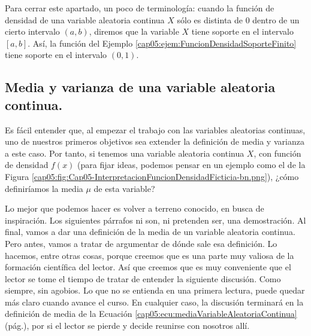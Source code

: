 Para cerrar este apartado, un poco de terminología: cuando la función de densidad de una variable aleatoria continua $X$ sólo es distinta de $0$ dentro de un cierto intervalo $(a,b)$, diremos que {\sf la variable $X$ tiene soporte en el intervalo $[a,b]$}. Así, la función del Ejemplo \ref{cap05:ejem:FuncionDensidadSoporteFinito} tiene soporte en el intervalo $(0,1)$.
%
%

\subsection{Media y varianza de una variable aleatoria continua.}
\label{cap05:subsec:MediaVarianzaVariableAleatoriaContinua}

Es fácil entender que, al empezar el trabajo con las variables aleatorias continuas, uno de nuestros primeros objetivos sea extender la definición de media y varianza a este caso. Por tanto, si tenemos una variable aleatoria continua $X$, con función de densidad $f(x)$ (para fijar ideas, podemos pensar en un ejemplo como el de la Figura \ref{cap05:fig:Cap05-InterpretacionFuncionDensidadFicticia-bn.png}), ¿cómo definiríamos la media $\mu$ de esta variable?

Lo mejor que podemos hacer es volver a terreno conocido, en busca de inspiración. Los siguientes párrafos ni son, ni pretenden ser, una demostración. Al final, vamos a dar una definición de la media de un variable aleatoria continua. Pero antes, vamos a tratar de argumentar de dónde sale esa definición. Lo hacemos, entre otras cosas, porque creemos que es una parte muy valiosa de la formación científica del lector. Así que creemos que es muy conveniente que el lector se tome el tiempo de tratar de entender la siguiente discusión. Como siempre, sin agobios. Lo que no se entienda en una primera lectura, puede quedar más claro cuando avance el curso. En cualquier caso, la discusión terminará en la definición de media de la Ecuación \ref{cap05:ecu:mediaVariableAleatoriaContinua} (pág.\pageref{cap05:ecu:mediaVariableAleatoriaContinua}), por si el lector se pierde y decide reunirse con nosotros allí.


